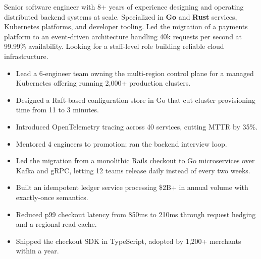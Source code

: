 

\begin{justify}
Senior software engineer with 8+ years of experience designing and operating distributed backend systems at scale. Specialized in \textbf{Go} and \textbf{Rust} services, Kubernetes platforms, and developer tooling. Led the migration of a payments platform to an event-driven architecture handling 40k requests per second at 99.99\% availability. Looking for a staff-level role building reliable cloud infrastructure.
\end{justify}


\begin{itemize}
  \item Lead a 6-engineer team owning the multi-region control plane for a managed Kubernetes offering running 2,000+ production clusters.
  \item Designed a Raft-based configuration store in Go that cut cluster provisioning time from 11 to 3 minutes.
  \item Introduced OpenTelemetry tracing across 40 services, cutting MTTR by 35\%.
  \item Mentored 4 engineers to promotion; ran the backend interview loop.
\end{itemize}

\vspace{2pt}

\begin{itemize}
  \item Led the migration from a monolithic Rails checkout to Go microservices over Kafka and gRPC, letting 12 teams release daily instead of every two weeks.
  \item Built an idempotent ledger service processing \$2B+ in annual volume with exactly-once semantics.
  \item Reduced p99 checkout latency from 850\:ms to 210\:ms through request hedging and a regional read cache.
  \item Shipped the checkout SDK in TypeScript, adopted by 1,200+ merchants within a year.
\end{itemize}

